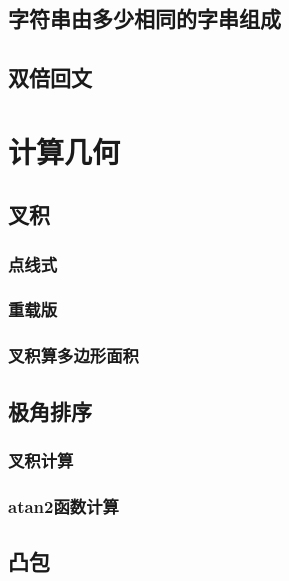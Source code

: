 \documentclass{article}
\begin{document}
\subsection{字符串由多少相同的字串组成}


\subsection{双倍回文}



\section{计算几何}

\subsection{叉积}
\subsubsection{点线式}
 
\subsubsection{重载版}
 
\subsubsection{叉积算多边形面积}


\subsection{极角排序}
\subsubsection{叉积计算}

\subsubsection{atan2函数计算}


\subsection{凸包}
\end{document}
